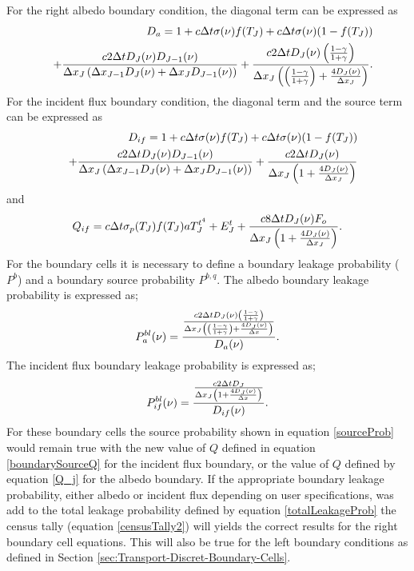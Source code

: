 	For the right albedo boundary condition, the diagonal term can be expressed as
	\begin{eqnarray}
	\label{albedoBoundaryD}
	&&D_a=1+c\Delta{t}\sigma(\nu){f(T_J)}+c\Delta{t}\sigma(\nu){(1-f(T_J))}\nonumber \\ && +{c2\Delta{t}D_{J}(\nu)D_{J-1}(\nu)\over{\Delta{x_J}\left(\Delta{x_{J-1}}D_{J}(\nu)+\Delta{x_{J}}D_{J-1}(\nu)\right)}}+{c2\Delta{t}D_J(\nu)\left({1-\gamma\over{1+\gamma}}\right)\over{\Delta{x_J}\left(\left({1-\gamma\over{1+\gamma}}\right)+{4D_J(\nu)\over{\Delta{x}_J}}\right)}}.
	\end{eqnarray}
	For the incident flux boundary condition, the diagonal term and the source term can be expressed as 
	\begin{eqnarray}
	\label{incidentBoundaryD}
	&&D_{if}=1+c\Delta{t}\sigma(\nu){f(T_J)}+c\Delta{t}\sigma(\nu){(1-f(T_J))}\nonumber \\ && +{c2\Delta{t}D_{J}(\nu)D_{J-1}(\nu)\over{\Delta{x_J}\left(\Delta{x_{J-1}}D_{J}(\nu)+\Delta{x_{J}}D_{J-1}(\nu)\right)}}+{c2\Delta{t}D_J(\nu)\over{\Delta{x_J}\left(1+{4D_J(\nu)\over{\Delta{x}_J}}\right)}}\end{eqnarray}
	and
	\begin{equation}
	\label{boundarySourceQ}
	Q_{if}=c\Delta{t}\sigma_p(T_J)f(T_J)aT^{t^4}_J+E_J^t+{c8\Delta{t}D_J(\nu){F_o}\over{\Delta{x_J}\left(1+{4D_J(\nu)\over{\Delta{x}_J}}\right)}}.
	\end{equation}
	For the boundary cells it is necessary to define a boundary leakage probability ($P^{b}$) and a boundary source probability $P^{b,q}$. The albedo boundary leakage probability is expressed as;
	\begin{equation}
	\label{boundaryLeakageProbAl}
	P^{bl}_a(\nu)={{c2\Delta{t}D_J(\nu)\left({1-\gamma\over{1+\gamma}}\right)\over{\Delta{x_J}\left(\left({1-\gamma\over{1+\gamma}}\right)+{4D_J(\nu)\over{\Delta{x}}}\right)}}\over{D_a(\nu)}}.
	\end{equation}
	The incident flux boundary leakage probability is expressed as;
	\begin{equation}
	\label{boundaryLeakageProbIF}
	P^{bl}_{if}(\nu)={{c2\Delta{t}D_J\over{\Delta{x_J}\left(1+{4D_J(\nu)\over{\Delta{x}}}\right)}}\over{D_{if}(\nu)}}.
	\end{equation}
	For these boundary cells the source probability shown in equation \ref{sourceProb} would remain true with the new value of $Q$ defined in equation \ref{boundarySourceQ} for the incident flux boundary, or the value of $Q$ defined by equation \ref{Q_j} for the albedo boundary. If the appropriate boundary leakage probability, either albedo or incident flux depending on user specifications, was add to the total leakage probability defined by equation \ref{totalLeakageProb} the census tally (equation \ref{censusTally2}) will yields the correct results for the right boundary cell equations. This will also be true for the left boundary conditions as defined in Section \ref{sec:Transport-Discret-Boundary-Cells}.
	
